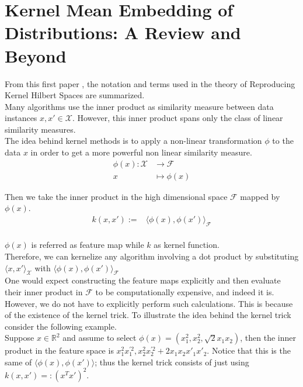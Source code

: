 
\section{Kernel Mean Embedding of Distributions: A Review and Beyond}
From this first paper \cite{Muandet_2017}, the notation and terms used in the theory of Reproducing Kernel Hilbert Spaces are summarized.
\\
Many algorithms use the inner product as similarity measure between data instances $x, x' \in \mathcal{X}$. However, this inner product spans only the class of linear similarity measures. 
\\
The idea behind kernel methods is to apply a non-linear transformation $\phi$ to the data $x$ 
in order to get a more powerful non linear similarity measure.
\begin{align*}
\phi(x):\mathcal{X} &\longrightarrow \mathcal{F}
    \\
    x&\mapsto \phi(x)
\end{align*}


Then we take the inner product in the high dimensional space $\mathcal{F}$ mapped by $\phi(x)$.
\\
\begin{align*}
k(x,x'):=&\langle \phi(x), \phi(x') \rangle_{\mathcal{F}}
\end{align*}
\\
$\phi(x)$ is referred as feature map while $k$ as kernel function.
\\
Therefore, we can kernelize any algorithm involving a dot product by substituting $\langle x, x' \rangle_{\mathcal{X}}$ with $\langle \phi(x), \phi(x') \rangle_{\mathcal{F}}$
\\
One would expect constructing the feature maps explicitly and then evaluate their inner product in $\mathcal{F}$ to be computationally expensive, and indeed it is. However, we do not have to explicitly perform such calculations. This is because of the existence of the kernel trick.
To illustrate the idea behind the kernel trick consider the following example. 
\\
Suppose $x \in \mathbb{R}^2$ and assume to select $\phi(x)=(x_{1}^{2},x_{2}^{2},\sqrt{2}x_{1}x_{2})$, then the inner product in the feature space is $x_{1}^{2}x_{1}^{'2},x_{2}^{2}x_{2}^{'2}+2x_{1}x_{2}x'_{1}x'_{2}$.
Notice that this is the same of $\langle \phi(x), \phi(x') \rangle$; thus the kernel trick consists of just using $k(x,x')=:(x^Tx')^2$.



